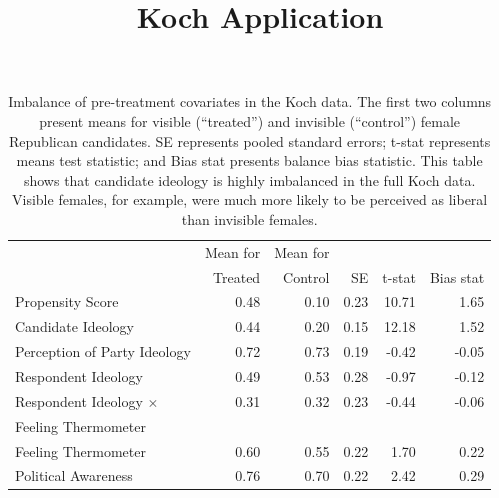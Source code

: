 \documentclass[11pt,letterpaper]{article}
\theoremstyle{plain}
\begin{document}
\title{Koch Application}

\maketitle

\begin{table}[ht]
  \begin{center}
    \begin{tabular}{lrrrrr}
      \hline
      & Mean for  & Mean for \\
      & Treated & Control  & SE & t-stat & Bias stat \\
      \hline
      Propensity Score & 0.48 & 0.10 & 0.23 & 10.71 & 1.65 \\
      Candidate Ideology & 0.44 & 0.20 & 0.15 & 12.18 & 1.52 \\
      Perception of Party Ideology & 0.72 & 0.73 & 0.19 & -0.42 & -0.05 \\
      Respondent Ideology & 0.49 & 0.53 & 0.28 & -0.97 & -0.12 \\
      Respondent Ideology $\times$ & 0.31 & 0.32 & 0.23 & -0.44 &
      -0.06 \\
      Feeling Thermometer \\
      Feeling Thermometer & 0.60 & 0.55 & 0.22 & 1.70 & 0.22 \\
      Political Awareness & 0.76 & 0.70 & 0.22 & 2.42 & 0.29 \\
      \hline
    \end{tabular}
    \caption{Imbalance of pre-treatment covariates in the Koch data.  The
      first two columns present means for visible (``treated'') and
      invisible (``control'') female Republican candidates. SE
      represents pooled standard errors; t-stat represents means test
      statistic; and Bias stat presents balance bias statistic.  This
      table shows that candidate ideology is highly imbalanced in the
      full Koch data.  Visible females, for example, were much more
      likely to be perceived as liberal than invisible females.}
    \label{tb:kochmtest}
  \end{center}
\end{table}
\end{document}
